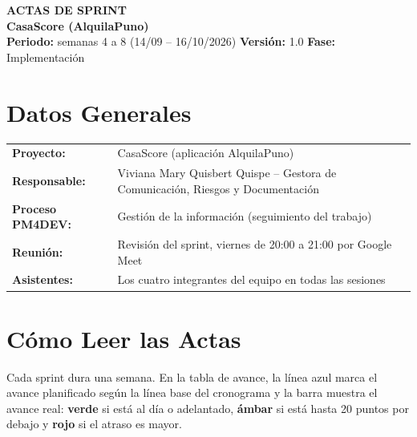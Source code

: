 \documentclass[11pt,a4paper]{article}
\begin{document}
\begin{center}
    {\Large \textbf{\textcolor{AzulUNA}{ACTAS DE SPRINT}}}\\[3pt]
    {\normalsize \textbf{CasaScore (AlquilaPuno)}}\\[4pt]
    \footnotesize \textbf{Periodo:} semanas 4 a 8 (14/09 -- 16/10/2026) \quad \textbar\quad \textbf{Versión:} 1.0 \quad \textbar\quad \textbf{Fase:} Implementación
\end{center}

\vspace{0.1cm}

\section{Datos Generales}
\noindent\begin{tabularx}{\textwidth}{@{}P{4.2cm} L@{}}
\toprule
\textbf{Proyecto:} & CasaScore (aplicación AlquilaPuno) \\
\textbf{Responsable:} & Viviana Mary Quisbert Quispe -- Gestora de Comunicación, Riesgos y Documentación \\
\textbf{Proceso PM4DEV:} & Gestión de la información (seguimiento del trabajo) \\
\textbf{Reunión:} & Revisión del sprint, viernes de 20:00 a 21:00 por Google Meet \\
\textbf{Asistentes:} & Los cuatro integrantes del equipo en todas las sesiones \\
\bottomrule
\end{tabularx}

\section{Cómo Leer las Actas}
Cada sprint dura una semana. En la tabla de avance, la línea azul marca el avance planificado según la línea base del cronograma y la barra muestra el avance real: \textcolor{Rama4}{\textbf{verde}} si está al día o adelantado, \textcolor{SevMedia}{\textbf{ámbar}} si está hasta 20 puntos por debajo y \textcolor{SevAlta}{\textbf{rojo}} si el atraso es mayor.
\end{document}
